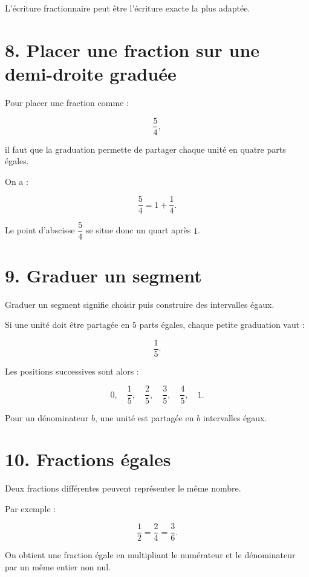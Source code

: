 L’écriture fractionnaire peut être l’écriture exacte la plus adaptée.

\section{8. Placer une fraction sur une demi-droite graduée}

Pour placer une fraction comme :

\[
\dfrac{5}{4},
\]

il faut que la graduation permette de partager chaque unité en quatre parts égales.


On a :

\[
\dfrac{5}{4}
=
1+\dfrac{1}{4}.
\]

Le point d’abscisse $\dfrac{5}{4}$ se situe donc un quart après $1$.

\section{9. Graduer un segment}

Graduer un segment signifie choisir puis construire des intervalles égaux.

Si une unité doit être partagée en $5$ parts égales, chaque petite graduation vaut :

\[
\dfrac{1}{5}.
\]

Les positions successives sont alors :

\[
0,\quad
\dfrac{1}{5},\quad
\dfrac{2}{5},\quad
\dfrac{3}{5},\quad
\dfrac{4}{5},\quad
1.
\]

Pour un dénominateur $b$, une unité est partagée en $b$ intervalles égaux.

\section{10. Fractions égales}

Deux fractions différentes peuvent représenter le même nombre.

Par exemple :

\[
\dfrac{1}{2}
=
\dfrac{2}{4}
=
\dfrac{3}{6}.
\]

On obtient une fraction égale en multipliant le numérateur et le dénominateur par un même entier non nul.

